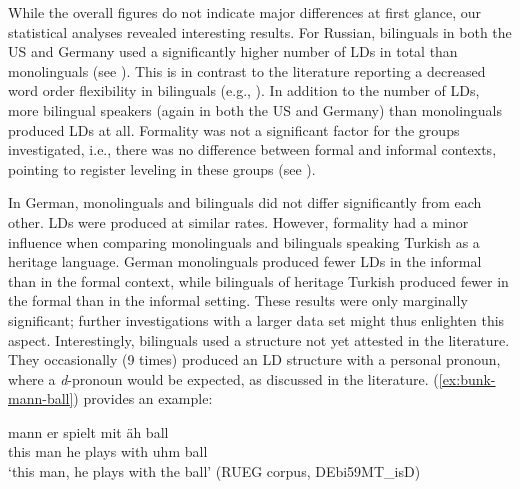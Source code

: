\documentclass[output=paper,colorlinks,citecolor=brown]{langscibook}
\begin{document}
While the overall figures do not indicate major differences at first glance, our statistical analyses revealed interesting results. For Russian, bilinguals in both the US and Germany used a significantly higher number of LDs in total than monolinguals (see \citealp{zerbian_leftdislocations}). This is in contrast to the literature reporting a decreased word order flexibility in bilinguals (e.g., \cite{laleko_word_2018}). In addition to the number of LDs, more bilingual speakers (again in both the US and Germany) than monolinguals produced LDs at all. Formality was not a significant factor for the groups investigated, i.e., there was no difference between formal and informal contexts, pointing to register leveling in these groups (see \cite{ozsoy_shifting_2022}).

In German, monolinguals and bilinguals did not differ significantly from each other. LDs were produced at similar rates. However, formality had a minor influence when comparing monolinguals and bilinguals speaking Turkish as a heritage language. German monolinguals produced fewer LDs in the informal than in the formal context, while bilinguals of heritage Turkish produced fewer in the formal than in the informal setting. These results were only marginally significant; further investigations with a larger data set might thus enlighten this aspect. Interestingly, bilinguals used a structure not yet attested in the literature. They occasionally (9 times) produced an LD structure with a personal pronoun, where a \textit{d}-pronoun would be expected, as discussed in the literature. (\ref{ex:bunk-mann-ball}) provides an example: 

\begin{exe}
   \ex \label{ex:bunk-mann-ball}
    {mann} {er} {spielt} {mit} {äh} {ball} \\
   this man he plays with uhm ball \\  
   \glt ‘this man, he plays with the ball' (RUEG corpus, DEbi59MT\_isD)
\end{exe}
\end{document}
